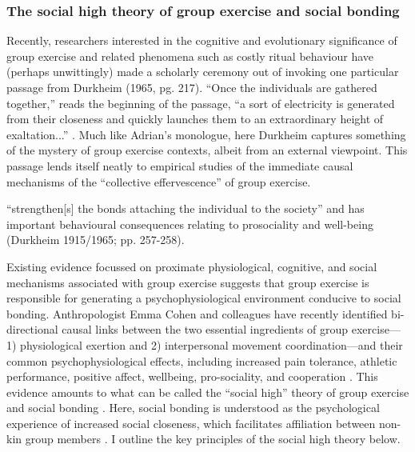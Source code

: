 \begin{CJK}{UTF8}{gbsn}
\subsubsection{The social high theory of group exercise and social bonding \label{sect:socialHigh}}

Recently, researchers interested in the cognitive and evolutionary significance of group exercise and related phenomena such as costly ritual behaviour have (perhaps unwittingly) made a scholarly ceremony out of invoking one particular passage from Durkheim (1965, pg. 217).  ``Once the individuals are gathered together,'' reads the beginning of the passage, ``a sort of electricity is generated from their closeness and quickly launches them to an extraordinary height of exaltation...'' \citep[see ][]{McNeill1995,Konvalinka2011,Fischer2014,Mogan2017}.  Much like Adrian's monologue, here Durkheim captures something of the mystery of group exercise contexts, albeit from an external viewpoint.  This passage lends itself neatly to empirical studies of the immediate causal mechanisms of the ``collective effervescence'' of group exercise.


“strengthen[s] the bonds attaching the individual to the society” and has important behavioural consequences relating to prosociality and well-being (Durkheim 1915/1965; pp. 257-258). 

Existing evidence focussed on proximate physiological, cognitive, and social mechanisms associated with group exercise suggests that group exercise is responsible for generating a psychophysiological environment conducive to social bonding.  Anthropologist Emma Cohen and colleagues have recently identified bi-directional causal links between the two essential ingredients of group exercise---1) physiological exertion and 2) interpersonal movement coordination---and their common psychophysiological effects, including increased pain tolerance, athletic performance, positive affect, wellbeing, pro-sociality, and cooperation \citep{Davis2015}.  This evidence amounts to what can be called the ``social high'' theory of group exercise and social bonding \citep[hereafter ``the social high theory,'' see][]{Cohen2017}. Here, social bonding is understood as the psychological experience of increased social closeness, which facilitates affiliation between non-kin group members \citep{Tarr2014}.  I outline the key principles of the social high theory below.


\end{CJK}

